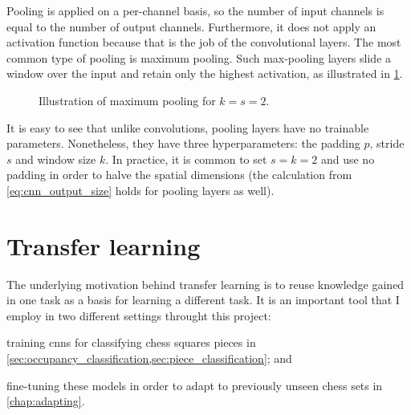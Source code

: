 \documentclass[../report.tex]{subfiles}
\begin{document}
Pooling is applied on a per-channel basis, so the number of input channels is equal to the number of output channels.
Furthermore, it does not apply an activation function because that is the job of the convolutional layers.
The most common type of pooling is maximum pooling.
Such max-pooling layers slide a window over the input and retain only the highest activation, as illustrated in \cref{fig:maxpool}.
\begin{figure}
    \centering
    \caption{Illustration of maximum pooling for $k=s=2$.}
    \label{fig:maxpool}
\end{figure}
It is easy to see that unlike convolutions, pooling layers have no trainable parameters.
Nonetheless, they have three hyperparameters: the padding $p$, stride $s$ and window size $k$.
In practice, it is common to set $s=k=2$ and use no padding in order to halve the spatial dimensions (the calculation from \cref{eq:cnn_output_size} holds for pooling layers as well).

\section{Transfer learning}
\label{sec:background_transfer_learning}
The underlying motivation behind transfer learning is to reuse knowledge gained in one task as a basis for learning a different task.
It is an important tool that I employ in two different settings throught this project:
\begin{enumerate*}[label=(\roman*)]
    \item training \glspl{cnn} for classifying chess squares pieces in \cref{sec:occupancy_classification,sec:piece_classification}; and
    \item fine-tuning these models in order to adapt to previously unseen chess sets in \cref{chap:adapting}.
\end{enumerate*}
\end{document}
